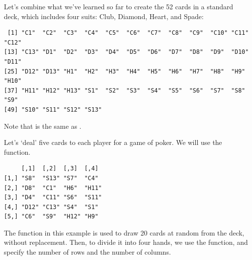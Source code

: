 Let's combine what we've learned so far to create the 52 cards  in a standard deck, which includes four suits: Club, Diamond, Heart, and Spade:
\begin{knitrout}
\color{fgcolor}\begin{kframe}
\begin{alltt}
 \hlkwb{<-} \hlstd{(}\hlstd{(}\hlstd{,}\hlstd{),} \hlstd{(}\hlstd{,}\hlstd{),} \hlstd{(}\hlstd{,}\hlstd{),} \hlstd{(}\hlstd{,}\hlstd{))}
 \hlkwb{<-}  \hlstd{(}\hlopt{:}\hlstd{,}\hlstd{)))}
\end{alltt}
\begin{verbatim}
 [1] "C1"  "C2"  "C3"  "C4"  "C5"  "C6"  "C7"  "C8"  "C9"  "C10" "C11" "C12"
[13] "C13" "D1"  "D2"  "D3"  "D4"  "D5"  "D6"  "D7"  "D8"  "D9"  "D10" "D11"
[25] "D12" "D13" "H1"  "H2"  "H3"  "H4"  "H5"  "H6"  "H7"  "H8"  "H9"  "H10"
[37] "H11" "H12" "H13" "S1"  "S2"  "S3"  "S4"  "S5"  "S6"  "S7"  "S8"  "S9" 
[49] "S10" "S11" "S12" "S13"
\end{verbatim}
\end{kframe}
\end{knitrout}
Note that  is the same as .

Let's `deal' five cards to each player for a game of poker. We will use the  function.
\begin{knitrout}
\color{fgcolor}\begin{kframe}
\begin{alltt}
\hlstd{(}\hlstd{)}
 \hlkwb{<-} \hlstd{(}\hlstd{,}\hlstd{=}\hlstd{),} \hlstd{=}\hlstd{,} \hlstd{=}\hlstd{))}
\end{alltt}
\begin{verbatim}
     [,1]  [,2]  [,3]  [,4] 
[1,] "S8"  "S13" "S7"  "C4" 
[2,] "D8"  "C1"  "H6"  "H11"
[3,] "D4"  "C11" "S6"  "S11"
[4,] "D12" "C13" "S4"  "S1" 
[5,] "C6"  "S9"  "H12" "H9" 
\end{verbatim}
\end{kframe}
\end{knitrout}
The  function in this example is used to draw 20 cards at random from the deck, without replacement. Then, to divide it into four hands, we use the  function, and specify the number of rows and the number of columns.

